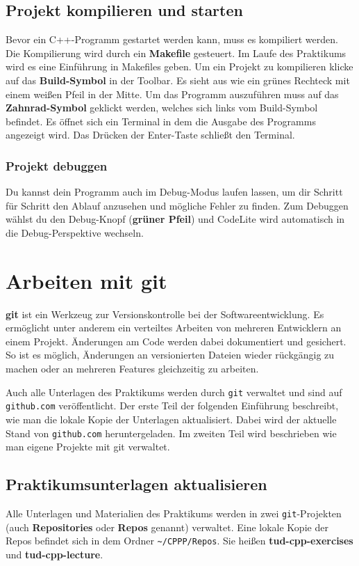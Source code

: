 \subsection{Projekt kompilieren und starten}
Bevor ein C++-Programm gestartet werden kann, muss es kompiliert werden.
Die Kompilierung wird durch ein \textbf{Makefile} gesteuert. Im Laufe des Praktikums wird es eine Einführung in Makefiles geben.
Um ein Projekt zu kompilieren klicke auf das \textbf{Build-Symbol} in der Toolbar. Es sieht aus wie ein grünes Rechteck mit einem weißen Pfeil in der Mitte.
Um das Programm auszuführen muss auf das \textbf{Zahnrad-Symbol} geklickt werden, welches sich links vom Build-Symbol befindet. Es öffnet sich ein Terminal in dem die Ausgabe des Programms angezeigt wird. Das Drücken der Enter-Taste schließt den Terminal.


\subsubsection{Projekt debuggen}
Du kannst dein Programm auch im Debug-Modus laufen lassen, um dir Schritt für Schritt den Ablauf anzusehen und mögliche Fehler zu finden.
Zum Debuggen wählst du den Debug-Knopf (\textbf{grüner Pfeil}) und CodeLite wird automatisch in die Debug-Perspektive wechseln. 

\section{Arbeiten mit git}

\textbf{git} ist ein Werkzeug zur Versionskontrolle bei der Softwareentwicklung.
Es ermöglicht unter anderem ein verteiltes Arbeiten von mehreren Entwicklern an einem Projekt.
Änderungen am Code werden dabei dokumentiert und gesichert.
So ist es möglich, Änderungen an versionierten Dateien wieder rückgängig zu machen oder an mehreren Features gleichzeitig zu arbeiten.

Auch alle Unterlagen des Praktikums werden durch \texttt{git} verwaltet und sind auf \texttt{github.com} veröffentlicht.
Der erste Teil der folgenden Einführung beschreibt, wie man die lokale Kopie der Unterlagen aktualisiert.
Dabei wird der aktuelle Stand von \texttt{github.com} heruntergeladen.
Im zweiten Teil wird beschrieben wie man eigene Projekte mit git verwaltet.

\subsection{Praktikumsunterlagen aktualisieren}
Alle Unterlagen und Materialien des Praktikums werden in zwei \texttt{git}-Projekten (auch \textbf{Repositories} oder \textbf{Repos} genannt) verwaltet.
Eine lokale Kopie der Repos befindet sich in dem Ordner \texttt{\textasciitilde/CPPP/Repos}.
Sie heißen \textbf{tud-cpp-exercises} und \textbf{tud-cpp-lecture}.

